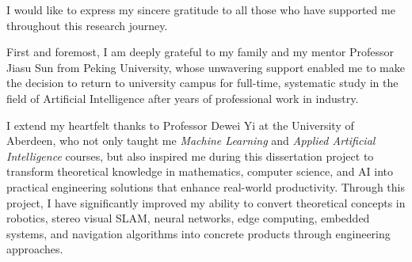 \documentclass[MSc]{abdnthesis}
\begin{document}
\begin{acknowledgements}
  
  I would like to express my sincere gratitude to all those who have supported me throughout this research journey.
  
  First and foremost, I am deeply grateful to my family and my mentor Professor Jiasu Sun from Peking University, whose unwavering support enabled me to make the decision to return to university campus for full-time, systematic study in the field of Artificial Intelligence after years of professional work in industry.
  
  I extend my heartfelt thanks to Professor Dewei Yi at the University of Aberdeen, who not only taught me \textit{Machine Learning} and \textit{Applied Artificial Intelligence} courses, but also inspired me during this dissertation project to transform theoretical knowledge in mathematics, computer science, and AI into practical engineering solutions that enhance real-world productivity. Through this project, I have significantly improved my ability to convert theoretical concepts in robotics, stereo visual SLAM, neural networks, edge computing, embedded systems, and navigation algorithms into concrete products through engineering approaches.
  

\end{acknowledgements}
\end{document}
